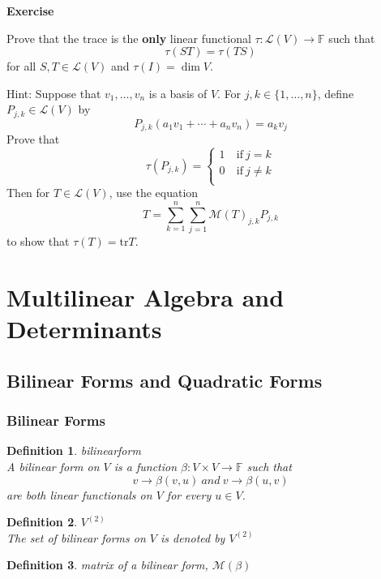 \documentclass{article}
\newtheorem{definition}{Definition}[subsection]
\newenvironment{exercise}{%
{\textbf{Exercise\\}
    }
}{
}
\newcommand{\FF}{\mathbb{F}}
\newcommand{\tr}{\text{tr}}
\begin{document}
\begin{CJK}{UTF8}{gkai}
\begin{exercise}
    Prove that the trace is the \textbf{only} linear functional $\tau: \mathcal{L}(V) \to \FF$ such that
    \[\tau(ST) = \tau(TS)\]
    for all $S,T \in \mathcal{L}(V)$ and $\tau(I) = \dim V$.

    Hint: Suppose that $v_1,\ldots,v_n$ is a basis of $V$. For $j,k \in \{1,\ldots,n\}$, define $P_{j,k} \in \mathcal{L}(V)$ by 
    \[P_{j,k}(a_1v_1 + \cdots +a_n v_n) = a_k v_j\]
    Prove that
    \[\tau(P_{j,k}) = \begin{cases}
        1 & ~\text{if}~ j = k\\
        0 & ~\text{if}~ j \neq k\\
    \end{cases}\]
    Then for $T \in \mathcal{L}(V)$, use the equation 
    \[T = \sum_{k = 1}^{n}\sum_{j = 1}^{n}\mathcal{M}(T)_{j,k} P_{j,k}\]
    to show that $\tau(T) = \tr T$.
\end{exercise}


\section{Multilinear Algebra and Determinants}

\subsection{Bilinear Forms and Quadratic Forms}

\subsubsection{Bilinear Forms}

\begin{definition}
    bilinearform\\

    A bilinear form on $V$ is a function $\beta: V \times V \to \FF$ such that
    \[v\to\beta(v,u) ~and~ v\to\beta(u,v)\]
    are both linear functionals on $V$ for every $u\in V$.
\end{definition}

\begin{definition}
    $V^{(2)}$\\

    The set of bilinear forms on $V$ is denoted by $V^{(2)}$
\end{definition}

\begin{definition}
    matrix of a bilinear form, $\mathcal{M}(\beta)$\\
    

\end{definition}
\end{CJK}
\end{document}
